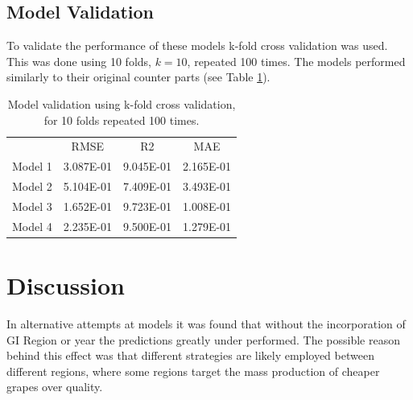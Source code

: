 \documentclass[review,12pt,authoryear]{elsarticle}
\begin{document}
\begin{linenumbers}
\subsection{Model Validation}
To validate the performance of these models k-fold cross validation was used. This was done using 10 folds, $k=10$, repeated 100 times. The models performed similarly to their original counter parts (see Table \ref*{tab:kfold}).
\begin{table}[]
  \label{tab:kfold}
  \caption{Model validation using k-fold cross validation, for 10 folds repeated 100 times.}
  \begin{tabular}{cccc}
          & RMSE      & R2        & MAE       \\
  Model 1 & 3.087E-01 & 9.045E-01 & 2.165E-01 \\
  Model 2 & 5.104E-01 & 7.409E-01 & 3.493E-01 \\
  Model 3 & 1.652E-01 & 9.723E-01 & 1.008E-01 \\
  Model 4 & 2.235E-01 & 9.500E-01 & 1.279E-01
  \end{tabular}
  \end{table}
\section{Discussion}
% 
%
%
In alternative attempts at models it was found that without the incorporation of GI Region or year the predictions greatly under performed. The possible reason behind this effect was that different strategies are likely employed between different regions, where some regions target the mass production of cheaper grapes over quality. %
%

\end{linenumbers}
\end{document}
